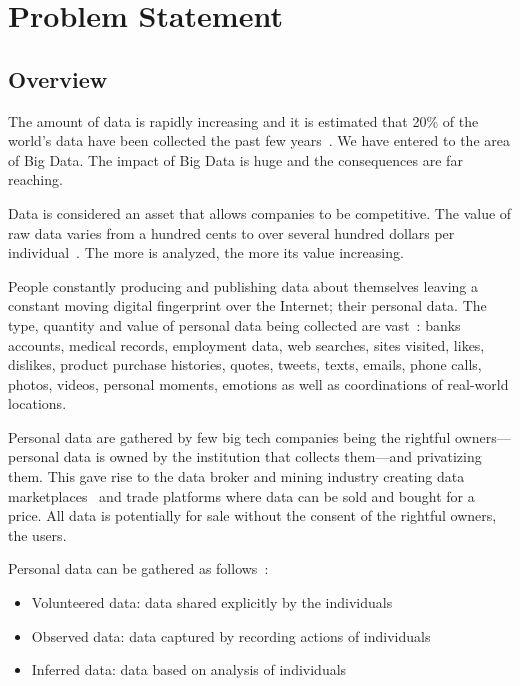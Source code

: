 \chapter{Problem Statement}
\label{problem}

\section{Overview}
\label{problem:overview}

The amount of data is rapidly increasing and it is estimated that 20\% of the world's data have been collected the past few years~\cite{10.1109/SPW.2015.27,big_data_better_worse}. We have entered to the area of Big Data. The impact of Big Data is huge and the consequences are far reaching.

Data is considered an asset that allows companies to be competitive. The value of raw data varies from a hundred cents to over several hundred dollars per individual~\cite{pr_data_cost_1, pr_data_cost_2, pr_data_cost_3}. The more is analyzed, the more its value increasing.

People constantly producing and publishing data about themselves
leaving a constant moving digital fingerprint over the Internet; their personal data. The type, quantity and value of personal data being collected are vast~\cite{emergence_new_assets_wef}: banks accounts, medical records, employment data, web searches, sites visited,
likes, dislikes, product purchase histories, quotes, tweets, texts, emails, phone calls, photos, videos, personal moments, emotions as well as coordinations of real-world locations.

Personal data are gathered by few big tech companies being the rightful owners---personal data is owned by the institution that collects them---and privatizing them. This gave rise to the data broker and mining industry creating data marketplaces~\cite{dawex, q_dx, datastreamx} and trade platforms where data can be sold and bought for a price. All data is potentially for sale without the consent of the rightful owners, the users.

Personal data can be gathered as follows~\cite{emergence_new_assets_wef}:

\begin{itemize}
  \item Volunteered data: data shared explicitly by the individuals
  \item Observed data: data captured by recording actions of individuals
  \item Inferred data: data based on analysis of individuals
\end{itemize}

